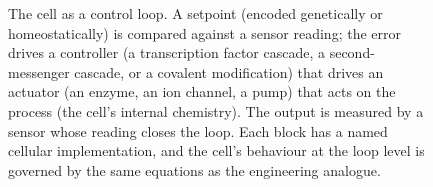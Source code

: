 \begin{figure}[htbp]
\caption[The cell as a control loop]{The cell as a control loop. A
setpoint (encoded genetically or homeostatically) is compared against
a sensor reading; the error drives a controller (a transcription
factor cascade, a second-messenger cascade, or a covalent modification)
that drives an actuator (an enzyme, an ion channel, a pump) that acts
on the process (the cell's internal chemistry). The output is measured
by a sensor whose reading closes the loop. Each block has a named
cellular implementation, and the cell's behaviour at the loop level is
governed by the same equations as the engineering analogue.}
\label{fig:vol06:ch01:control-loop}
\end{figure}
